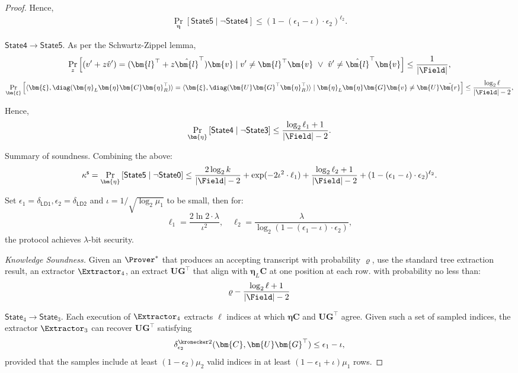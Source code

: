 \begin{proof}
Hence,
\begin{align*}
    \Pr_{\bm{\eta}}\left[ \mathsf{State5} \mid \neg \mathsf{State4} \right]
    \le   (1-(\epsilon_1 - \iota)\cdot \epsilon_2)^{\ell_2}.
\end{align*}

\noindent
{$\mathsf{State4} \rightarrow \mathsf{State5}$.}
As per the Schwartz-Zippel lemma,
\[
    \Pr_{z} \left[
    (v'+z\hat{v}') = (\bm{l}^\top + z\hat{\bm{l}}^\top) \bm{v} 
    \mid
    v' \ne \bm{l}^\top \bm{v}
    ~\vee~
    \hat{v}' \ne \hat{\bm{l}}^\top\bm{v} 
    \right]
    \le \frac{1}{|\Field|},
\]
\[
    \Pr_{\bm{\xi}} \left[
    \langle \bm{\xi}, \mathsf{\diag}(\bm{\eta}_L\bm{\eta}\bm{C}\bm{\eta}_R^\top) \rangle
=\langle \bm{\xi}, \mathsf{\diag}(\bm{U}\bm{G}^\top\bm{\eta}_R^\top) \rangle
    \mid
    \bm{\eta}_L\bm{\eta}\bm{G}\bm{v} \ne \bm{U}\tilde{\bm{r}}
    \right]
    \le \frac{\log_2 \ell}{|\Field|-2},
\]

Hence,
\[
    \Pr_{\bm{\eta}}\left[ \mathsf{State4} \mid \neg \mathsf{State3} \right] \le  \frac{\log_2 \ell_1 + 1}{|\Field|-2}.
\]



\noindent
{Summary of soundness.}
Combining the above:
\[
    \kappa^\mathsf{s} = 
    \Pr_{\bm{\eta}}\left[ \mathsf{State5} \mid \neg \mathsf{State0} \right] \le 
    \frac{2\log_2 k}{|\Field|-2} + \exp(-2\iota^2 \cdot \ell_1)  +  \frac{\log_2 \ell_2 +1}{|\Field|-2} + (1-(\epsilon_1 - \iota)\cdot \epsilon_2)^{\ell_2}.
\]

Set $\epsilon_1  = \delta_\mathsf{LD1},  \epsilon_2=\delta_\mathsf{LD2}$ and $\iota = 1/\sqrt{\log_2 \mu_1}$ to be small,
then for:
\[
    \ell_1 = \frac{2\ln 2 \cdot \lambda}{\iota^2}, \quad
    \ell_2 = \frac{\lambda}{\log_2(1-(\epsilon_1-\iota)\cdot \epsilon_2)},
\]
the protocol achieves $\lambda$-bit security.

\medskip
\noindent
{\em Knowledge Soundness.}
Given an $\Prover^*$ that produces an accepting transcript with probability $\varrho$,
use the standard tree extraction result,
an extractor $\Extractor_4$,
an extract $\bm{U}\bm{G}^\top$ that align with $\bm{\eta}_L\bm{C}$ at one position at each row.
with probability no less than:
\[
    \varrho -  \frac{\log_2 \ell +1}{|\Field|-2}
\]


\noindent
{\sf $\mathsf{State}_4 \rightarrow \mathsf{State}_3$.}
Each execution of $\Extractor_4$ extracts $\ell$ indices at which
$\bm{\eta}\bm{C}$ and $\bm{U}\bm{G}^\top$ agree.
Given such a set of sampled indices, the extractor $\Extractor_3$
can recover $\bm{U}\bm{G}^\top$ satisfying
\[
    \delta^{\kronecker 2}_{\epsilon_2}(\bm{C},\bm{U}\bm{G}^\top)
    \le \epsilon_1 - \iota,
\]
provided that the samples include at least $(1-\epsilon_2)\mu_2$ valid indices
in at least $(1-\epsilon_1+\iota)\mu_1$ rows.


\end{proof}
